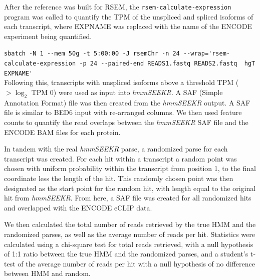 After the reference was built for RSEM, the \texttt{rsem-calculate-expression} program was called to quantify the TPM of the unspliced and spliced isoforms of each transcript, where EXPNAME was replaced with the name of the ENCODE experiment being quantified. 

\lstinline{sbatch -N 1 --mem 50g -t 5:00:00 -J rsemChr -n 24 --wrap='rsem-calculate-expression -p 24 --paired-end READS1.fastq READS2.fastq  hgT EXPNAME'}\\

Following this, transcripts with unspliced isoforms above a threshold TPM ($> \log_2$ TPM 0) were used as input into \emph{hmmSEEKR}. A SAF (Simple Annotation Format) file was then created from the \emph{hmmSEEKR} output. A SAF file is similar to BED6 input with re-arranged columns. We then used feature counts to quantify the read overlaps between the \emph{hmmSEEKR} SAF file and the ENCODE BAM files for each protein. 

In tandem with the real \emph{hmmSEEKR} parse, a randomized parse for each transcript was created. For each hit within a transcript a random point was chosen with uniform probability within the transcript from position 1, to the final coordinate less the length of the hit. This randomly chosen point was then designated as the start point for the random hit, with length equal to the original hit from \emph{hmmSEEKR}. From here, a SAF file was created for all randomized hits and overlapped with the ENCODE eCLIP data. 

We then calculated the total number of reads retrieved by the true HMM and the randomized parses, as well as the average number of reads per hit. Statistics were calculated using a chi-square test for total reads retrieved, with a null hypothesis of 1:1 ratio between the true HMM and the randomized parses, and a student's t-test of the average number of reads per hit with a null hypothesis of no difference between HMM and random. 
\begin{singlespace}
\printbibliography[heading=bibintoc,title={References}]
\end{singlespace}